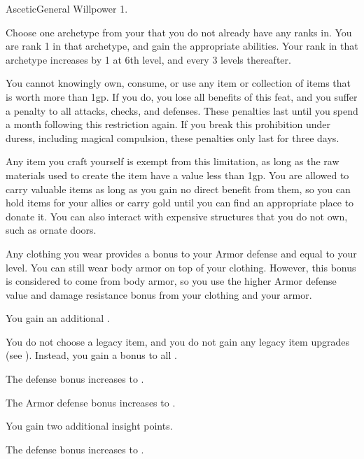   \begin{feat}{Ascetic}{General}
    \featpre Willpower 1.

     Choose one archetype from your  that you do not already have any
    ranks in.
    You are rank 1 in that archetype, and gain the appropriate abilities.
    Your rank in that archetype increases by 1 at 6th level, and every 3 levels thereafter.

     You cannot knowingly own, consume, or use any item or collection of items that is worth more than 1gp.
    If you do, you lose all benefits of this feat, and you suffer a  penalty to all attacks, checks, and defenses.
    These penalties last until you spend a month following this restriction again.
    If you break this prohibition under duress, including magical compulsion, these penalties only last for three days.

    Any item you craft yourself is exempt from this limitation, as long as the raw materials used to create the item have a value less than 1gp.
    You are allowed to carry valuable items as long as you gain no direct benefit from them, so you can hold items for your allies or carry gold until you can find an appropriate place to donate it.
    You can also interact with expensive structures that you do not own, such as ornate doors.

     Any clothing you wear provides a  bonus to your Armor defense and  equal to your level.
    You can still wear body armor on top of your clothing.
    However, this bonus is considered to come from body armor, so you use the higher Armor defense value and damage resistance bonus from your clothing and your armor.

     You gain an additional .

     You do not choose a legacy item, and you do not gain any legacy item upgrades (see ).
    Instead, you gain a  bonus to all .

     The defense bonus increases to .

     The Armor defense bonus increases to .

     You gain two additional insight points.

     The defense bonus increases to .
  \end{feat}

